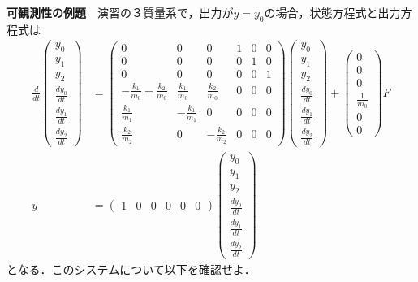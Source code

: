 \documentclass[a4paper,11pt]{jreport}
\begin{document}
\noindent
{\bf 可観測性の例題}　演習の３質量系で，出力が$y=y_0$の場合，状態方程式と出力方程式は
\begin{align}
 \frac{d}{dt} \left(\begin{array}{c}
	         y_0 \\
		     y_1 \\
		     y_2 \\
		     \frac{dy_0}{dt} \\
		     \frac{dy_1}{dt} \\
		     \frac{dy_2}{dt}
		    \end{array}\right)
 &=
 \left(\begin{array}{cccccc}
        0 & 0 & 0 & 1 & 0 & 0      \\
        0 & 0 & 0 & 0 & 1 & 0      \\
        0 & 0 & 0 & 0 & 0 & 1      \\
	-\frac{k_1}{m_0} -\frac{k_2}{m_0}&  \frac{k_1}{m_0} &  \frac{k_2}{m_0} & 0 & 0 & 0 \\
	 \frac{k_1}{m_1}                & -\frac{k_1}{m_1} &  0               & 0 & 0 & 0 \\
	 \frac{k_2}{m_2}                &  0               & -\frac{k_2}{m_2} & 0 & 0 & 0 
       \end{array}\right)
 \left(\begin{array}{c}
	         y_0 \\
		     y_1 \\
		     y_2 \\
		     \frac{dy_0}{dt} \\
		     \frac{dy_1}{dt} \\
		     \frac{dy_2}{dt}
       \end{array}\right)
 +
 \left(\begin{array}{c}
        0 \\
        0 \\
        0 \\
	    \frac{1}{m_0} \\
	    0 \\
	    0 
       \end{array}\right)
        F
\nonumber
\\
y &=
 \left(\begin{array}{cccccc}
         1 & 0 & 0 & 0 & 0 & 0
       \end{array}\right)
 \left(\begin{array}{c}
	         y_0 \\
		     y_1 \\
		     y_2 \\
		     \frac{dy_0}{dt} \\
		     \frac{dy_1}{dt} \\
		     \frac{dy_2}{dt}
       \end{array}\right)
\nonumber
\end{align}
となる．このシステムについて以下を確認せよ．
\end{document}
